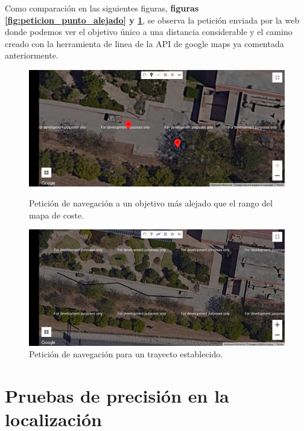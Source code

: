 Como comparación en las siguientes figuras, \textbf{figuras \ref{fig:peticion_punto_alejado} y \ref{fig:peticion_camino}}, se observa la petición enviada por la web donde podemos ver el objetivo único a una distancia considerable y el 
camino creado con la herramienta de linea de la API de google maps ya comentada anteriormente.


\begin{figure}[htbp]
  \centering
  \begin{minipage}[b]{0.45\textwidth}
    \centering
    \includegraphics[width=\textwidth]{images/punto_inter_web.jpeg}
    \caption{Petición de navegación a un objetivo más alejado que el rango del mapa de coste.}
    \label{fig:peticion_punto_alejado}
  \end{minipage}
  \hfill
  \begin{minipage}[b]{0.45\textwidth}
    \centering
    \includegraphics[width=\textwidth]{images/camino_inter_web.jpeg}
    \caption{Petición de navegación para un trayecto establecido.}
    \label{fig:peticion_camino}
  \end{minipage}
\end{figure}


\section{Pruebas de precisión en la localización}

